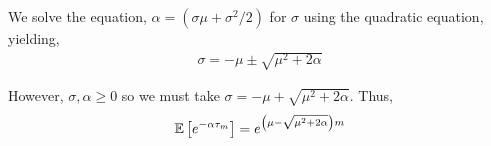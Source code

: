 \documentclass[10pt]{article}
\begin{document}
\begin{solution}[Solution]
We solve the equation, \( \alpha = (\sigma\mu + \sigma^2/2) \) for \( \sigma \) using the quadratic equation, yielding,
\begin{align*}
    \sigma 
    = -\mu \pm \sqrt{\mu^2+2\alpha}
\end{align*}

However, \( \sigma,\alpha \geq 0 \) so we must take \( \sigma = -\mu + \sqrt{\mu^2+2\alpha} \).
Thus,
\begin{align*}
    \mathbb{E} \left[ e^{-\alpha \tau_m} \right] = e^{\left(\mu-\sqrt{\mu^2+2\alpha}\right)m}
\end{align*}

\end{solution}
\end{document}
